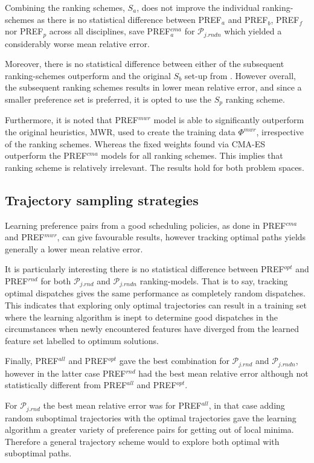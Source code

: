 \documentclass[smallextended]{llncs}
\newcommand{\PREF}[2]{PREF$_{#2}^{#1}$}
\begin{document}
Combining the ranking schemes, $S_{a}$, does not improve the individual ranking-schemes as there is no statistical difference between \PREF{}{a} and \PREF{}{b}, \PREF{}{f} nor \PREF{}{p}  across all  disciplines, save \PREF{cma}{a} for $\mathcal{P}_{j.rndn}$ which yielded a considerably worse mean relative error. 

Moreover, there is no statistical difference between either of the subsequent ranking-schemes outperform and the original $S_b$ set-up from \cite{InRu11a}. However overall, the subsequent ranking schemes results in lower mean relative error, and since a smaller preference set is preferred, it is opted to use the $S_{p}$ ranking scheme. 

Furthermore, it is noted that \PREF{mwr}{} model is able to significantly outperform the original heuristics, MWR, used to create the training data $\Phi^{mwr}$, irrespective of the ranking schemes. Whereas the fixed weights found via CMA-ES outperform the \PREF{cma}{} models for all ranking schemes. This implies that ranking scheme is relatively irrelevant. The results hold for both problem spaces. 

\subsection{Trajectory sampling strategies}\label{sec:expr:track}
Learning preference pairs from a good scheduling policies, as done  in \PREF{cma}{} and \PREF{mwr}{}, can give favourable results, however tracking optimal paths yields generally a lower mean relative error. 

It is particularly interesting there is no statistical difference between \PREF{opt}{} and \PREF{rnd}{} for both 
$\mathcal{P}_{j.rnd}$ and $\mathcal{P}_{j.rndn}$ ranking-models. That is to say, tracking optimal dispatches gives the same performance as completely random dispatches. This indicates that exploring 
only optimal trajectories can result in a training set where the learning algorithm is inept to determine good 
dispatches in the circumstances when newly encountered features have diverged from the learned feature set labelled to optimum solutions. 

Finally, \PREF{all}{} and \PREF{opt}{} gave the best combination for $\mathcal{P}_{j.rnd}$ and $\mathcal{P}_{j.rndn}$, however in the latter case \PREF{rnd}{} had the best mean relative error although not statistically different from \PREF{all}{} and \PREF{opt}{}.

For $\mathcal{P}_{j.rnd}$  the best mean relative error was for \PREF{all}{}, in that case adding random suboptimal trajectories with the optimal trajectories gave the learning algorithm a greater variety of preference pairs for getting out of local minima. Therefore a general trajectory scheme would to explore both optimal with suboptimal paths.
\end{document}
